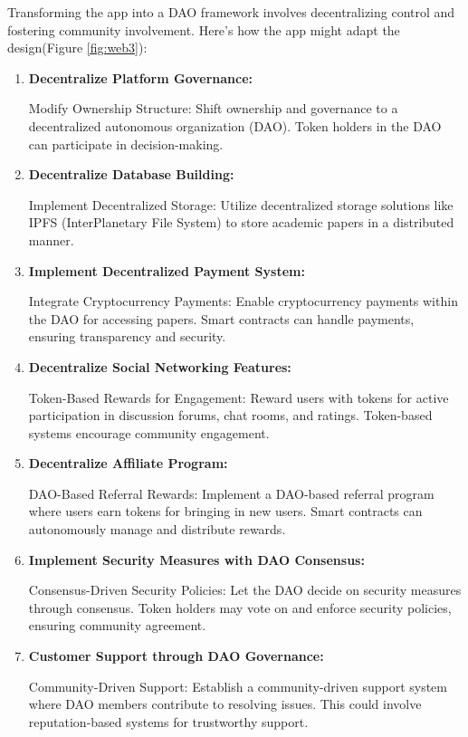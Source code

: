 \documentclass[lettersize,journal]{IEEEtran}
\begin{document}
Transforming the app into a DAO framework involves decentralizing control and fostering community involvement. Here's how the app might adapt the design(Figure \ref{fig:web3}):

\begin{enumerate}
  \item \textbf{Decentralize Platform Governance:}
  
  Modify Ownership Structure: Shift ownership and governance to a decentralized autonomous organization (DAO). Token holders in the DAO can participate in decision-making.
  \item \textbf{Decentralize Database Building:}
  
  Implement Decentralized Storage: Utilize decentralized storage solutions like IPFS (InterPlanetary File System) to store academic papers in a distributed manner.
  \item  \textbf{Implement Decentralized Payment System:}
  
  Integrate Cryptocurrency Payments: Enable cryptocurrency payments within the DAO for accessing papers. Smart contracts can handle payments, ensuring transparency and security.
  \item \textbf{Decentralize Social Networking Features:}
  
  Token-Based Rewards for Engagement: Reward users with tokens for active participation in discussion forums, chat rooms, and ratings. Token-based systems encourage community engagement.
  \item \textbf{Decentralize Affiliate Program:}
  
  DAO-Based Referral Rewards: Implement a DAO-based referral program where users earn tokens for bringing in new users. Smart contracts can autonomously manage and distribute rewards.
  \item \textbf{Implement Security Measures with DAO Consensus:}
  
  Consensus-Driven Security Policies: Let the DAO decide on security measures through consensus. Token holders may vote on and enforce security policies, ensuring community agreement.
  \item \textbf{Customer Support through DAO Governance:}
  
  Community-Driven Support: Establish a community-driven support system where DAO members contribute to resolving issues. This could involve reputation-based systems for trustworthy support.
\end{enumerate}
\end{document}
